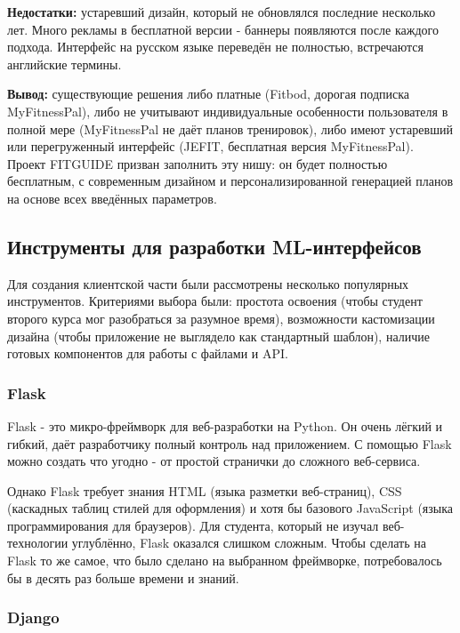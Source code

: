 \documentclass[14pt, a4paper]{extarticle}
\begin{document}
\begin{enumerate}
\noindent \textbf{Недостатки:} устаревший дизайн, который не обновлялся последние несколько лет. Много рекламы в бесплатной версии - баннеры появляются после каждого подхода. Интерфейс на русском языке переведён не полностью, встречаются английские термины.

\medskip
\noindent \textbf{Вывод:} существующие решения либо платные (Fitbod, дорогая подписка MyFitnessPal), либо не учитывают индивидуальные особенности пользователя в полной мере (MyFitnessPal не даёт планов тренировок), либо имеют устаревший или перегруженный интерфейс (JEFIT, бесплатная версия MyFitnessPal). Проект FITGUIDE призван заполнить эту нишу: он будет полностью бесплатным, с современным дизайном и персонализированной генерацией планов на основе всех введённых параметров.

\subsection{Инструменты для разработки ML-интерфейсов}

\noindent Для создания клиентской части были рассмотрены несколько популярных инструментов. Критериями выбора были: простота освоения (чтобы студент второго курса мог разобраться за разумное время), возможности кастомизации дизайна (чтобы приложение не выглядело как стандартный шаблон), наличие готовых компонентов для работы с файлами и API.

\subsubsection{Flask}

\noindent Flask - это микро-фреймворк для веб-разработки на Python. Он очень лёгкий и гибкий, даёт разработчику полный контроль над приложением. С помощью Flask можно создать что угодно - от простой странички до сложного веб-сервиса.

\noindent Однако Flask требует знания HTML (языка разметки веб-страниц), CSS (каскадных таблиц стилей для оформления) и хотя бы базового JavaScript (языка программирования для браузеров). Для студента, который не изучал веб-технологии углублённо, Flask оказался слишком сложным. Чтобы сделать на Flask то же самое, что было сделано на выбранном фреймворке, потребовалось бы в десять раз больше времени и знаний.

\subsubsection{Django}


\end{enumerate}
\end{document}
